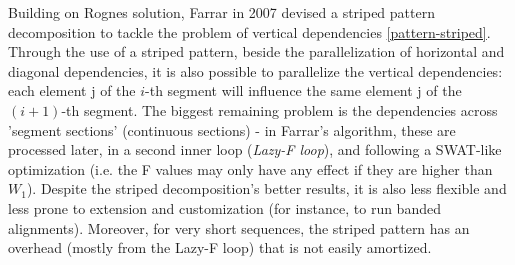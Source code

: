\label{section-farrar}

Building on Rognes solution, Farrar \cite{farrar} in 2007 devised a striped pattern decomposition to tackle the problem of vertical dependencies \autoref{pattern-striped}. Through the use of a striped pattern, beside the parallelization of horizontal and diagonal dependencies, it is also  possible to parallelize the vertical dependencies: each element j of the $i$-th segment will influence the same element j of the $(i+1)$-th segment. The biggest remaining problem is the dependencies across 'segment sections' (continuous sections) - in Farrar's algorithm, these are processed later, in a second inner loop (\emph{Lazy-F loop}), and following a SWAT-like optimization (i.e. the F values may only have any effect if they are higher than $W_1$). Despite the striped decomposition's better results, it is also less flexible and less prone to extension and customization (for instance, to run banded alignments). Moreover, for very short sequences, the striped pattern has an overhead (mostly from the Lazy-F loop) that is not easily amortized.

